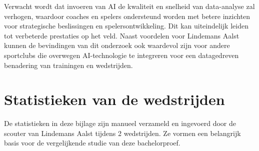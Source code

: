 \documentclass[dutch,dit,thesis]{hogentreport}
\begin{document}
Verwacht wordt dat invoeren van AI de kwaliteit en snelheid van data-analyse zal verhogen, waardoor coaches en spelers ondersteund worden met betere inzichten voor strategische beslissingen en spelersontwikkeling. Dit kan uiteindelijk leiden tot verbeterde prestaties op het veld. Naast voordelen voor Lindemans Aalst kunnen de bevindingen van dit onderzoek ook waardevol zijn voor andere sportclubs die overwegen AI-technologie te integreren voor een datagedreven benadering van trainingen en wedstrijden. 



%
\chapter{Statistieken van de wedstrijden}
De statistieken in deze bijlage zijn manueel verzameld en ingevoerd door de scouter van Lindemans Aalst tijdens 2 wedstrijden. Ze vormen een belangrijk basis voor de vergelijkende studie van deze bachelorproef.











\backmatter{}

\setlength\bibitemsep{2pt} %
\printbibliography[heading=bibintoc]
\end{document}
